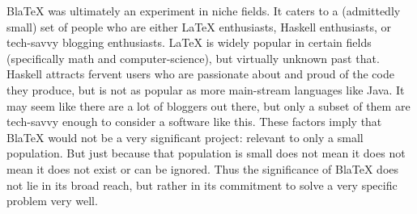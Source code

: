 
BlaTeX was ultimately an experiment in niche fields. It caters to a (admittedly small) set of people who are either LaTeX enthusiasts, Haskell enthusiasts, or tech-savvy blogging enthusiasts. LaTeX is widely popular in certain fields (specifically math and computer-science), but virtually unknown past that. Haskell attracts fervent users who are passionate about and proud of the code they produce, but is not as popular as more main-stream languages like Java. It may seem like there are a lot of bloggers out there, but only a subset of them are tech-savvy enough to consider a software like this. These factors imply that BlaTeX would not be a very significant project: relevant to only a small population. But just because that population is small does not mean it does not mean it does not exist or can be ignored. Thus the significance of BlaTeX does not lie in its broad reach, but rather in its commitment to solve a very specific problem very well.  



